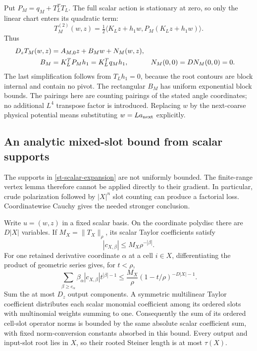 \documentclass[11pt]{article}
\theoremstyle{remark}
\begin{document}
Put $P_M=q_M+T_L^TT_L$. The full scalar action is stationary at zero, so
only the linear chart enters its quadratic term:
\begin{equation}
 T_M^{(2)}(w,z)=\tfrac12
 \langle K_Lz+h_1w,P_M(K_Lz+h_1w)\rangle.                    \label{st-quadratic-action}
\end{equation}
Thus
\begin{align}
 D_zT_M(w,z)&=A_{M,0}z+B_Mw+N_M(w,z),\notag\\
 B_M&=K_L^TP_Mh_1=K_L^Tq_Mh_1,&
 N_M(0,0)&=DN_M(0,0)=0.                                    \label{st-gradient-split}
\end{align}
The last simplification follows from $T_Lh_1=0$, because the root
contours are block internal and contain no pivot. The rectangular
$B_M$ has uniform exponential block bounds. The pairings here are
counting pairings of the stated angle coordinates; no additional
$L^4$ transpose factor is introduced. Replacing $w$ by the next-coarse
physical potential means substituting $w=L a_{\rm next}$ explicitly.

\subsection{An analytic mixed-slot bound from scalar supports}
\label{st-gradient-section}

The supports in \eqref{st-scalar-expansion} are not uniformly bounded.
The finite-range vertex lemma therefore cannot be applied directly to
their gradient. In particular, crude polarization followed by
$|X|^n$ slot counting can produce a factorial loss. Coordinatewise
Cauchy gives the needed stronger conclusion.

Write $u=(w,z)$ in a fixed scalar basis. On the coordinate polydisc
there are $D|X|$ variables. If $M_X=\|T_X\|_\rho$, its scalar Taylor
coefficients satisfy
\begin{equation}
 |c_{X,\beta}|\le M_X\rho^{-|\beta|}.                       \label{st-scalar-cauchy}
\end{equation}
For one retained derivative coordinate $\alpha$ at a cell $i\in X$,
differentiating the product of geometric series gives, for $t<\rho$,
\begin{equation}
 \sum_{\beta\ge e_\alpha}
 \beta_\alpha |c_{X,\beta}|t^{|\beta|-1}
 \le\frac{M_X}{\rho}(1-t/\rho)^{-D|X|-1}.                   \label{st-gradient-cauchy}
\end{equation}
Sum the at most $D_z$ output components. A symmetric multilinear Taylor
coefficient distributes each scalar monomial coefficient among its
ordered slots with multinomial weights summing to one. Consequently
the sum of its ordered cell-slot operator norms is bounded by the same
absolute scalar coefficient sum, with fixed norm-conversion constants
absorbed in this bound. Every output and input-slot root lies in $X$,
so their rooted Steiner length is at most $\tau(X)$.
\end{document}
